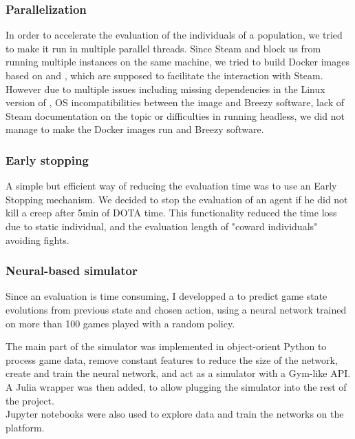 \subsubsection{Parallelization}
In order to accelerate the evaluation of the individuals of a population, we tried to make it run in multiple parallel threads. Since Steam and \dota block us from running multiple \dota instances on the same machine, we tried to build Docker images based on  and , which are supposed to facilitate the interaction with Steam. However due to multiple issues including missing dependencies in the Linux version of \dota, OS incompatibilities between the image and Breezy software, lack of Steam documentation on the topic or difficulties in running \dota headless, we did not manage to make the Docker images run \dota and Breezy software.

\subsubsection{Early stopping}

\label{sub:early-stop}
A simple but efficient way of reducing the evaluation time was to use an Early Stopping mechanism. We decided to stop the evaluation of an agent if he did not kill a creep after 5min of DOTA time. This functionality reduced the time loss due to static individual, and the evaluation length of "coward individuals" avoiding fights.

\subsubsection{Neural-based simulator}

Since an evaluation is time consuming, I developped a  to predict game state evolutions from previous state and chosen action, using a neural network trained on more than 100 games played with a random policy.

The  main part of the simulator was implemented in object-orient Python to process game data, remove constant features to reduce the size of the network, create and train the neural network, and act as a simulator with a Gym-like API. A Julia wrapper was then added, to allow plugging the simulator into the rest of the project.\\
Jupyter notebooks were also used to explore data and train the networks on the  platform.  


